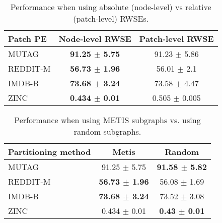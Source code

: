 \documentclass{article} \usepackage{iclr2024_conference,times}
\begin{document}
\begin{table}
    \centering
    \caption{Hyperparameters regarding the Graph-JEPA design for the TUD datasets.}
    \label{tab:hyperparams-app}  
\end{table}

\begin{table}
    \centering
    \caption{Performance when using absolute (node-level) vs relative (patch-level) RWSEs.}
    \begin{tabular}{|l|c|c|}
    \hline
    Patch PE & Node-level RWSE & Patch-level RWSE \\ \hline
    MUTAG    & \textbf{91.25 $\pm$ 5.75} & 91.23 $\pm$ 5.86 \\ \hline
    REDDIT-M & \textbf{56.73 $\pm$ 1.96} & 56.01 $\pm$ 2.1 \\ \hline
    IMDB-B   & \textbf{73.68 $\pm$ 3.24} & 73.58 $\pm$ 4.47 \\ \hline
    ZINC     & \textbf{0.434 $\pm$ 0.01} & 0.505 $\pm$ 0.005 \\ \hline
    \end{tabular}
    \label{tab:ablation_posemb}
\end{table}

\begin{table}
    \centering
    \caption{Performance when using METIS subgraphs vs. using random subgraphs.}
    \begin{tabular}{|l|c|c|}
    \hline
    Partitioning method & Metis & Random \\    \hline
    MUTAG    & 91.25 $\pm$ 5.75  &  \textbf{91.58 $\pm$ 5.82}\\ \hline
    REDDIT-M & \textbf{56.73 $\pm$ 1.96}  &  56.08 $\pm$ 1.69\\ \hline
    IMDB-B   & \textbf{73.68 $\pm$ 3.24}  &  73.52 $\pm$ 3.08\\ \hline
    ZINC     & 0.434 $\pm$ 0.01  &  \textbf{0.43  $\pm$ 0.01}\\ \hline
    \end{tabular}
    \label{tab:ablation_patches}
\end{table}
\end{document}

